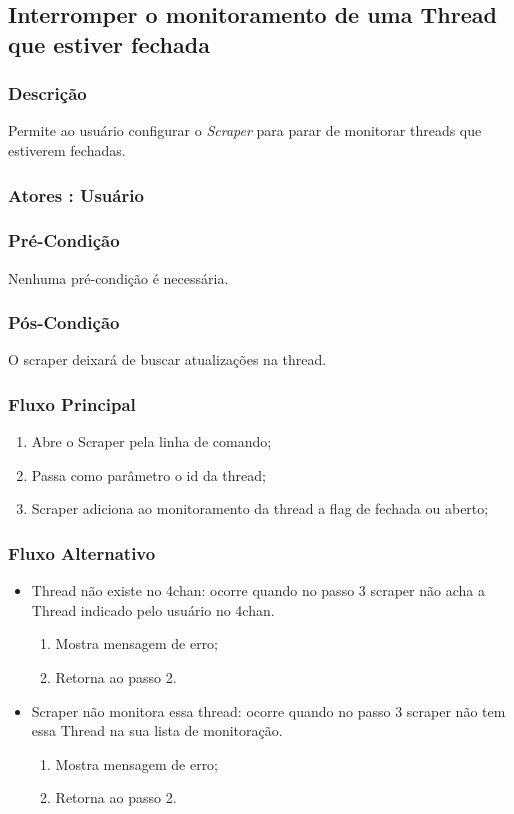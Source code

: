 \subsection{Interromper o monitoramento de uma Thread que estiver fechada}
\subsubsection{Descrição}
Permite ao usuário configurar o \textit{Scraper} para parar de monitorar threads que estiverem fechadas.
\subsubsection{Atores : Usuário}
\subsubsection{Pré-Condição}
Nenhuma pré-condição é necessária.
\subsubsection{Pós-Condição}
O scraper deixará de buscar atualizações na thread.
\subsubsection{Fluxo Principal}
\begin{enumerate}
    \item Abre o Scraper pela linha de comando;
    \item Passa como parâmetro o id da thread;
    \item Scraper adiciona ao monitoramento da thread a flag de fechada ou aberto;
\end{enumerate}
\subsubsection{Fluxo Alternativo}
\begin{itemize}
    \item Thread não existe no 4chan: ocorre quando no passo 3 scraper não acha a Thread indicado pelo usuário no 4chan.
    \begin{enumerate}
        \item Mostra mensagem de erro;
        \item Retorna ao passo 2.
    \end{enumerate}
    \item Scraper não monitora essa thread: ocorre quando no passo 3 scraper não tem essa Thread na sua lista de monitoração.
    \begin{enumerate}
        \item Mostra mensagem de erro;
        \item Retorna ao passo 2.
    \end{enumerate}
\end{itemize}


